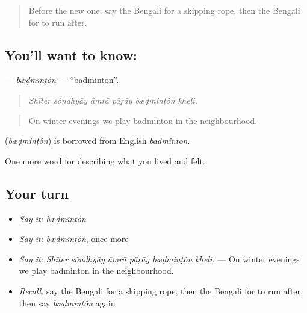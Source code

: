 \label{lesson:BN-C517-bedminton}



\begin{quote}
Before the new one: say the Bengali for a skipping rope, then the Bengali for to run after.
\end{quote}

\subsection*{You'll want to know: }
\textbf{} — \emph{bæḍminṭôn} — \textquotedblleft{}badminton\textquotedblright{}.

\begin{quote}
     
\end{quote}

\begin{quote}
\emph{Shīter sôndhyāy āmrā pāṛāy bæḍminṭôn kheli.}
\end{quote}

\begin{quote}
On winter evenings we play badminton in the neighbourhood.
\end{quote}

\begin{cousinweb}
\textbf{} (\emph{bæḍminṭôn}) is borrowed from English \emph{badminton}.
\end{cousinweb}

\begin{grammarlens}[title={What you've built}]
One more word for describing what you lived and felt.
\end{grammarlens}

\subsection*{Your turn}
\begin{itemize}
\raggedright
  \item \emph{Say it:} \emph{bæḍminṭôn}
  \item \emph{Say it:} \emph{bæḍminṭôn}, once more
  \item \emph{Say it:} \emph{Shīter sôndhyāy āmrā pāṛāy bæḍminṭôn kheli.} — On winter evenings we play badminton in the neighbourhood.
  \item \emph{Recall:} say the Bengali for a skipping rope, then the Bengali for to run after, then say \emph{bæḍminṭôn} again
\end{itemize}

